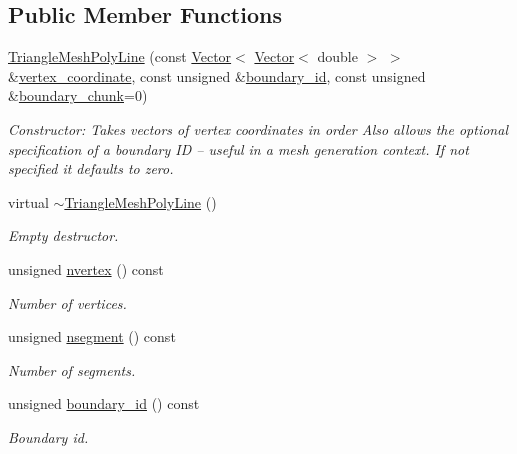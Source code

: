 \subsection*{Public Member Functions}
\begin{DoxyCompactItemize}
\item 
\hyperlink{classoomph_1_1TriangleMeshPolyLine_a40bbbeea638b97a4ad714a1e3e0950a4}{Triangle\+Mesh\+Poly\+Line} (const \hyperlink{classoomph_1_1Vector}{Vector}$<$ \hyperlink{classoomph_1_1Vector}{Vector}$<$ double $>$ $>$ \&\hyperlink{classoomph_1_1TriangleMeshPolyLine_adae759da7a0165a00c7af92e36092dd6}{vertex\+\_\+coordinate}, const unsigned \&\hyperlink{classoomph_1_1TriangleMeshPolyLine_af4fa1e14f3e2f8d16e085da928272872}{boundary\+\_\+id}, const unsigned \&\hyperlink{classoomph_1_1TriangleMeshPolyLine_a4535773043c6b9516b81df42468294c1}{boundary\+\_\+chunk}=0)
\begin{DoxyCompactList}\small\item\em Constructor\+: Takes vectors of vertex coordinates in order Also allows the optional specification of a boundary ID -- useful in a mesh generation context. If not specified it defaults to zero. \end{DoxyCompactList}\item 
virtual \hyperlink{classoomph_1_1TriangleMeshPolyLine_a7a2de094f944f5114002af38c98e59ce}{$\sim$\+Triangle\+Mesh\+Poly\+Line} ()
\begin{DoxyCompactList}\small\item\em Empty destructor. \end{DoxyCompactList}\item 
unsigned \hyperlink{classoomph_1_1TriangleMeshPolyLine_a7b6ab13f61cb9f4435dc4fc4fe1fa50d}{nvertex} () const
\begin{DoxyCompactList}\small\item\em Number of vertices. \end{DoxyCompactList}\item 
unsigned \hyperlink{classoomph_1_1TriangleMeshPolyLine_a51af74c24abbae9b2cc881946d8f2170}{nsegment} () const
\begin{DoxyCompactList}\small\item\em Number of segments. \end{DoxyCompactList}\item 
unsigned \hyperlink{classoomph_1_1TriangleMeshPolyLine_af4fa1e14f3e2f8d16e085da928272872}{boundary\+\_\+id} () const
\begin{DoxyCompactList}\small\item\em Boundary id. \end{DoxyCompactList}\item 

\end{DoxyCompactItemize}
